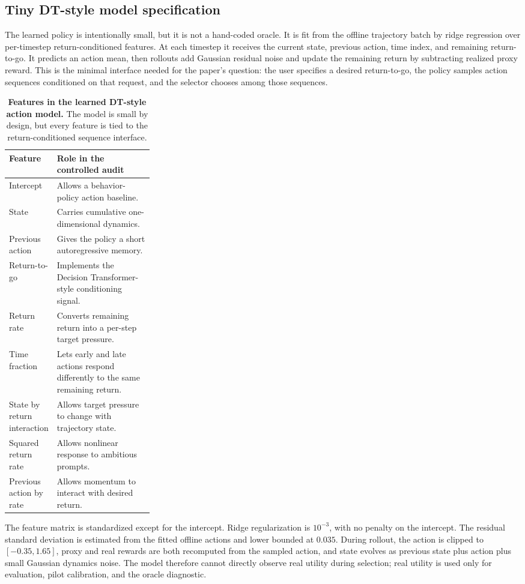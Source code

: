 \subsection{Tiny DT-style model specification}

The learned policy is intentionally small, but it is not a hand-coded oracle. It is fit from the offline trajectory batch by ridge regression over per-timestep return-conditioned features. At each timestep it receives the current state, previous action, time index, and remaining return-to-go. It predicts an action mean, then rollouts add Gaussian residual noise and update the remaining return by subtracting realized proxy reward. This is the minimal interface needed for the paper's question: the user specifies a desired return-to-go, the policy samples action sequences conditioned on that request, and the selector chooses among those sequences.

\begin{table}[t]
\centering
\small
\caption{\textbf{Features in the learned DT-style action model.} The model is small by design, but every feature is tied to the return-conditioned sequence interface.}
\label{tab:model-features}
\begin{tabularx}{\linewidth}{p{0.28\linewidth}X}
\toprule
Feature & Role in the controlled audit \\
\midrule
Intercept & Allows a behavior-policy action baseline. \\
State & Carries cumulative one-dimensional dynamics. \\
Previous action & Gives the policy a short autoregressive memory. \\
Return-to-go & Implements the Decision Transformer-style conditioning signal. \\
Return rate & Converts remaining return into a per-step target pressure. \\
Time fraction & Lets early and late actions respond differently to the same remaining return. \\
State by return interaction & Allows target pressure to change with trajectory state. \\
Squared return rate & Allows nonlinear response to ambitious prompts. \\
Previous action by rate & Allows momentum to interact with desired return. \\
\bottomrule
\end{tabularx}
\end{table}

The feature matrix is standardized except for the intercept. Ridge regularization is $10^{-3}$, with no penalty on the intercept. The residual standard deviation is estimated from the fitted offline actions and lower bounded at $0.035$. During rollout, the action is clipped to $[-0.35,1.65]$, proxy and real rewards are both recomputed from the sampled action, and state evolves as previous state plus action plus small Gaussian dynamics noise. The model therefore cannot directly observe real utility during selection; real utility is used only for evaluation, pilot calibration, and the oracle diagnostic.


